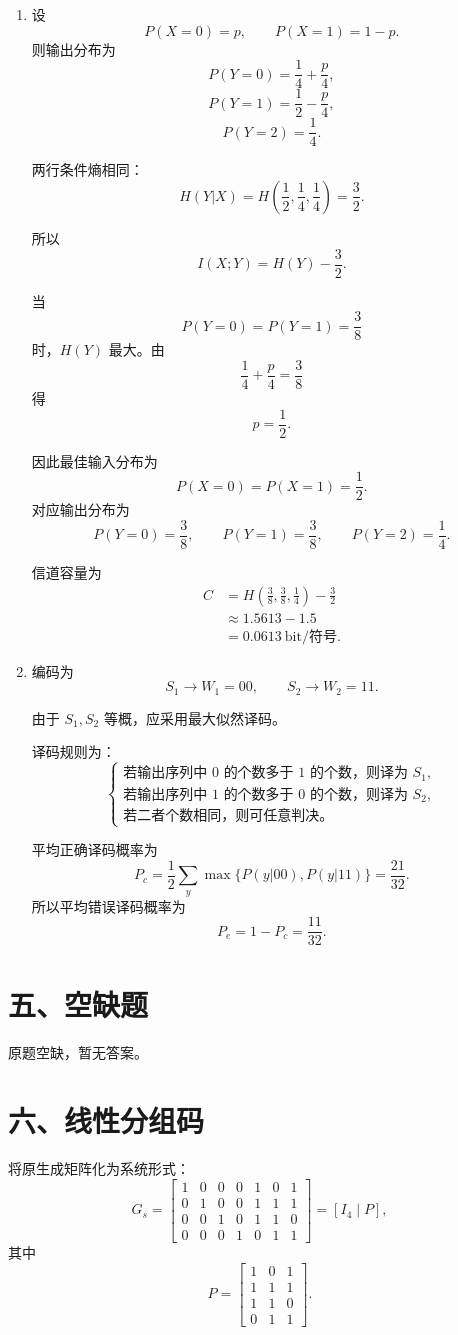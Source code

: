 \documentclass[UTF8,a4paper,12pt]{ctexart}
\begin{document}
\begin{enumerate}[label=\arabic*., leftmargin=2em]
\item 设
\[
P(X=0)=p,\qquad P(X=1)=1-p.
\]
则输出分布为
\[
P(Y=0)=\frac14+\frac p4,
\]
\[
P(Y=1)=\frac12-\frac p4,
\]
\[
P(Y=2)=\frac14.
\]

两行条件熵相同：
\[
H(Y|X)=H\left(\frac12,\frac14,\frac14\right)=\frac32.
\]

所以
\[
I(X;Y)=H(Y)-\frac32.
\]

当
\[
P(Y=0)=P(Y=1)=\frac38
\]
时，$H(Y)$ 最大。由
\[
\frac14+\frac p4=\frac38
\]
得
\[
p=\frac12.
\]

因此最佳输入分布为
\[
P(X=0)=P(X=1)=\frac12.
\]
对应输出分布为
\[
P(Y=0)=\frac38,\qquad
P(Y=1)=\frac38,\qquad
P(Y=2)=\frac14.
\]

信道容量为
\[
\begin{aligned}
C
&=H\left(\frac38,\frac38,\frac14\right)-\frac32\\
&\approx 1.5613-1.5\\
&=0.0613\ \text{bit/符号}.
\end{aligned}
\]

\item 编码为
\[
S_1\to W_1=00,\qquad S_2\to W_2=11.
\]

由于 $S_1,S_2$ 等概，应采用最大似然译码。

译码规则为：
\[
\begin{cases}
\text{若输出序列中 }0\text{ 的个数多于 }1\text{ 的个数，则译为 }S_1,\\
\text{若输出序列中 }1\text{ 的个数多于 }0\text{ 的个数，则译为 }S_2,\\
\text{若二者个数相同，则可任意判决。}
\end{cases}
\]

平均正确译码概率为
\[
P_c=\frac12\sum_y\max\{P(y|00),P(y|11)\}
=\frac{21}{32}.
\]
所以平均错误译码概率为
\[
P_e=1-P_c=\frac{11}{32}.
\]
\end{enumerate}

\section*{五、空缺题}

原题空缺，暂无答案。

\section*{六、线性分组码}

将原生成矩阵化为系统形式：
\[
G_s=
\begin{bmatrix}
1&0&0&0&1&0&1\\
0&1&0&0&1&1&1\\
0&0&1&0&1&1&0\\
0&0&0&1&0&1&1
\end{bmatrix}
=\left[I_4\mid P\right],
\]
其中
\[
P=
\begin{bmatrix}
1&0&1\\
1&1&1\\
1&1&0\\
0&1&1
\end{bmatrix}.
\]
\end{document}
